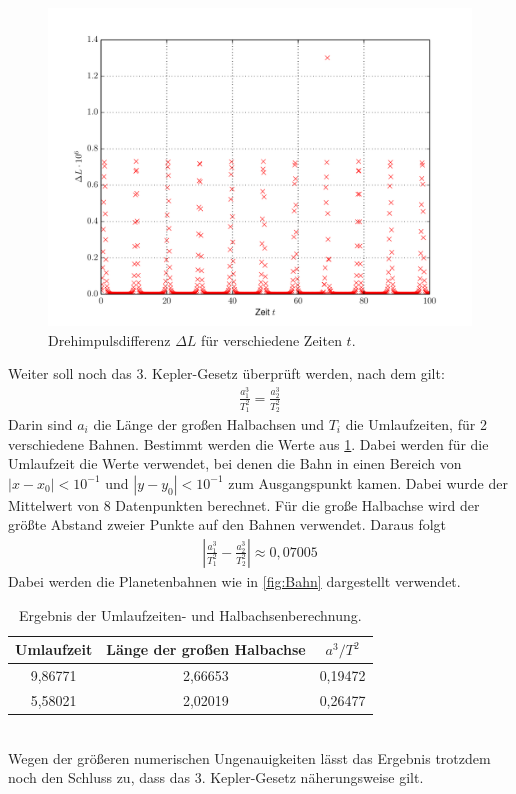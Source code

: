 \begin{figure}[H]
	\centering
	\includegraphics[width = \textwidth]{../Plots/Plot_4_Dreh.pdf}
	\caption{Drehimpulsdifferenz $\Delta L$ für verschiedene Zeiten $t$.\label{fig:Dreh}}
\end{figure}
Weiter soll noch das 3. Kepler-Gesetz überprüft werden, nach dem gilt:
\begin{align}
	\frac{a_1^3}{T_1^2}=\frac{a_2^3}{T_2^2}
\end{align}
Darin sind $a_i$ die Länge der großen Halbachsen und $T_i$ die Umlaufzeiten, für 2 verschiedene Bahnen.
Bestimmt werden die Werte aus \cref{tab:kepler}. Dabei werden für die Umlaufzeit die Werte verwendet, bei denen die Bahn in einen Bereich von $|x-x_0|<10^{-1}$ und $|y-y_0|<10^{-1}$ zum Ausgangspunkt kamen. Dabei wurde der Mittelwert von 8 Datenpunkten berechnet. Für die große Halbachse wird der größte Abstand zweier Punkte auf den Bahnen verwendet. 
Daraus folgt
\begin{align}
	\left|\frac{a_1^3}{T_1^2}-\frac{a_2^3}{T_2^2}\right|\approx 0,07005
\end{align}
Dabei werden die Planetenbahnen wie in \cref{fig:Bahn} dargestellt verwendet.
\begin{table}[h!]
	\centering
	\begin{tabular}{c|c|c}
		Umlaufzeit & Länge der großen Halbachse&$a^3/T^2$ \\\hline
		9,86771 & 2,66653 & 0,19472\\
		5,58021 & 2,02019 & 0,26477
	\end{tabular}\caption{Ergebnis der Umlaufzeiten- und Halbachsenberechnung.\label{tab:kepler}}
\end{table}\\
Wegen der größeren numerischen Ungenauigkeiten lässt das Ergebnis trotzdem noch den Schluss zu, dass das 3. Kepler-Gesetz näherungsweise gilt.

